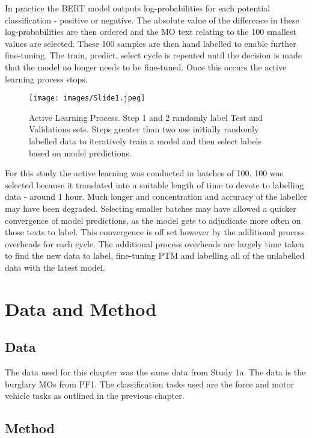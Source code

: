 In practice the BERT model outputs log-probabilities for each potential classification - positive or negative. The absolute value of the difference in these log-probabilities are then ordered and the MO text relating to the 100 smallest values are selected. These 100 samples are then hand labelled to enable further fine-tuning. The train, predict, select cycle is repeated until the decision is made that the model no longer needs to be fine-tuned. Once this occurs the active learning process stops. 

\begin{figure}[!tbp]
  \centering
    \texttt{[image: images/Slide1.jpeg]}
    \caption[Active Learning Process.]{Active Learning Process. Step 1 and 2 randomly label Test and Validations sets. Steps greater than two use initially randomly labelled data to iteratively train a model and then select labels based on model predictions.}
    \label{fig:active_process}
\end{figure}

 For this study the active learning was conducted in batches of 100. 100 was selected because it translated into a suitable length of time to devote to labelling data - around 1 hour. Much longer and concentration and accuracy of the labeller may have been degraded. Selecting smaller batches may have allowed a quicker convergence of model predictions, as the model gets to adjudicate more often on those texts to label. This convergence is off set however by the additional process overheads for each cycle. The additional process overheads are largely time taken to find the new data to label, fine-tuning PTM and labelling all of the unlabelled data with the latest model.
 
\section{Data and Method}


\subsection{Data}

The data used for this chapter was the same data from Study 1a. The data is the burglary MOs from PF1. The classification tasks used are the force and motor vehicle tasks as outlined in the previous chapter.

\subsection{Method}

